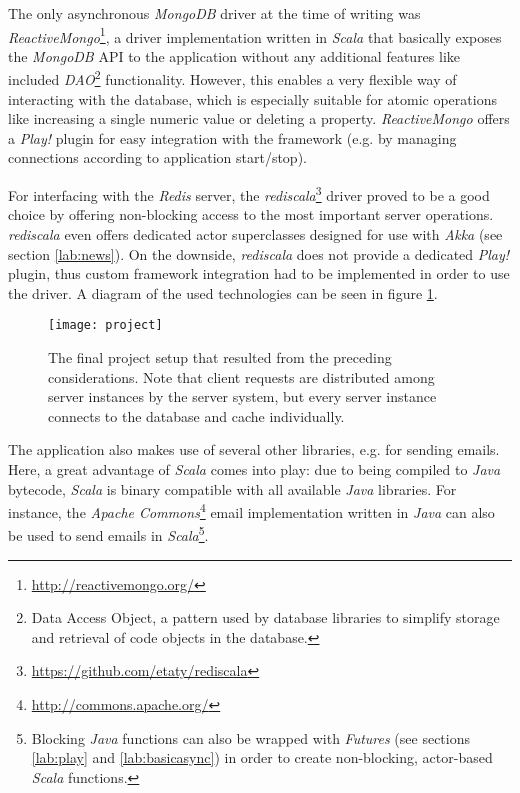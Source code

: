 The only asynchronous \textit{MongoDB} driver at the time of writing was \textit{ReactiveMongo}\footnote{\url{http://reactivemongo.org/}}, a driver implementation written in \textit{Scala} that basically exposes the \textit{MongoDB} API to the application without any additional features like included \textit{DAO}\footnote{Data Access Object, a pattern used by database libraries to simplify storage and retrieval of code objects in the database.} functionality. However, this enables a very flexible way of interacting with the database, which is especially suitable for atomic operations like increasing a single numeric value or deleting a property. \textit{ReactiveMongo} offers a \textit{Play!} plugin for easy integration with the framework (e.g. by managing connections according to application start/stop).

For interfacing with the \textit{Redis} server, the \textit{rediscala}\footnote{\url{https://github.com/etaty/rediscala}} driver proved to be a good choice by offering non-blocking access to the most important server operations. \textit{rediscala} even offers dedicated actor superclasses designed for use with \textit{Akka} (see section \ref{lab:news}). On the downside, \textit{rediscala} does not provide a dedicated \textit{Play!} plugin, thus custom framework integration had to be implemented in order to use the driver. A diagram of the used technologies can be seen in figure \ref{fig:project}. 

\begin{figure}
\centering\small
\setlength{\tabcolsep}{0mm}
  \texttt{[image: project]}
\caption{
The final project setup that resulted from the preceding considerations. Note that client requests are distributed among server instances by the server system, but every server instance connects to the database and cache individually.
}
\label{fig:project}
\end{figure}

The application also makes use of several other libraries, e.g. for sending emails. Here, a great advantage of \textit{Scala} comes 
into play: due to being compiled to \textit{Java} bytecode, \textit{Scala} is binary compatible with all available \textit{Java} libraries. For instance, the \textit{Apache Commons}\footnote{\url{http://commons.apache.org/}} email implementation written in \textit{Java} can also be used to send emails in \textit{Scala}\footnote{Blocking \textit{Java} functions can also be wrapped with \textit{Futures} (see sections \ref{lab:play} and \ref{lab:basicasync}) in order to create non-blocking, actor-based \textit{Scala} functions.}.

